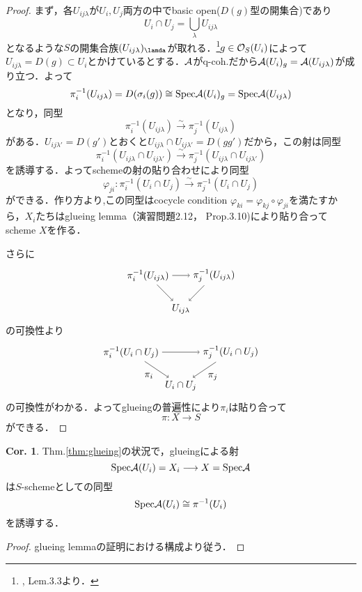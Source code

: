 \documentclass[dvipdfmx,b5paper,papersize]{jsarticle}
\theoremstyle{definition}
\newtheorem{cor}[thm]{Cor.}
\begin{document}
\begin{proof}
  まず，各$U_{ij\lambda}$が$U_i,U_j$両方の中でbasic open($D(g)$型の開集合)であり
  \[
    U_i \cap U_j=\bigcup_{\lambda}U_{ij\lambda}
  \]
  となるような$S$の開集合族$(U_{ij\lambda})_\lamda$が取れる．\footnote{\cite{Gortz}, Lem.3.3より．}$g \in {\cal{O}}_S(U_i)$によって$U_{ij\lambda}=D(g) \subset U_i$とかけているとする．$\cal{A}$がq-coh.だから${\cal{A}}(U_i)_g={\cal{A}}(U_{ij\lambda})$が成り立つ．よって
  \[
  \pi_{i}^{-1}(U_{ij \lambda})=D(\sigma_i(g))\cong {\rm Spec}{\cal{A}}(U_i)_g={\rm Spec}{\cal{A}}(U_{ij\lambda})
  \]
  となり，同型
  \[
    \pi_{i}^{-1}(U_{ij\lambda}) \xrightarrow{\sim} \pi_{j}^{-1}(U_{ij\lambda})
  \]
  がある．$U_{ij\lambda'}=D(g')$とおくと$U_{ij\lambda} \cap U_{ij\lambda'}=D(gg')$だから，この射は同型
  \[
    \pi_{i}^{-1}(U_{ij\lambda} \cap U_{ij\lambda'}) \xrightarrow{\sim} \pi_{j}^{-1}(U_{ij\lambda} \cap U_{ij\lambda'})
  \]
  を誘導する．よってschemeの射の貼り合わせにより同型
  \[
    \varphi_{ji}:\pi_{i}^{-1}(U_i\cap U_j) \xrightarrow{\sim} \pi_{j}^{-1}(U_i\cap U_j)
  \]
  ができる．作り方より,この同型はcocycle condition $\varphi_{ki}=\varphi_{kj} \circ \varphi_{ji}$を満たすから，$X_i$たちはglueing lemma（\cite{ハーツホーン}演習問題2.12，\cite{Gortz} Prop.3.10)により貼り合ってscheme $X$を作る．

  さらに
  \[
    \begin{tikzpicture}[auto,->]
      \node (a) at (0,1.2) {$\pi_{i}^{-1}(U_{ij\lambda})$}; \node (x) at (2.4,1.2) {$\pi_{j}^{-1}(U_{ij\lambda})$};
      \node (b) at (1.2,0) {$U_{ij\lambda}$};
      \draw (a) -- node {$\scriptstyle $} (x);

      \draw (a) -- node[swap] {$\scriptstyle $} (b);
      \draw (x) -- node[swap] {$\scriptstyle $} (b);
    \end{tikzpicture}
  \]
  の可換性より
  \[
    \begin{tikzpicture}[auto,->]
      \node (a) at (0,1.2) {$\pi_{i}^{-1}(U_i \cap U_j)$}; \node (x) at (3.6,1.2) {$\pi_{j}^{-1}(U_i \cap U_j)$};
      \node (b) at (1.8,0) {$U_i \cap U_j$};
      \draw (a) -- node {$\scriptstyle $} (x);

      \draw (a) -- node[swap] {$\pi_i$} (b);
      \draw (x) -- node {$\pi_j$} (b);
    \end{tikzpicture}
  \]
  の可換性がわかる．よってglueingの普遍性により$\pi_i$は貼り合って
  \[
    \pi:X \longrightarrow S
  \]
  ができる．
\end{proof}

\begin{cor}\label{thm:iso}
  {\rm Thm.\ref{thm:glueing}}の状況で，glueingによる射
  \[
    {\rm Spec}{\cal{A}}(U_i)=X_i \longrightarrow X={\rm Spec}{\cal{A}}
  \]
  は$S$-schemeとしての同型
  \[
    {\rm Spec}{\cal{A}}(U_i)\cong \pi^{-1}(U_i)
  \]
  を誘導する．
\end{cor}
\begin{proof}
  glueing lemmaの証明における構成より従う．

\end{proof}
\end{document}
